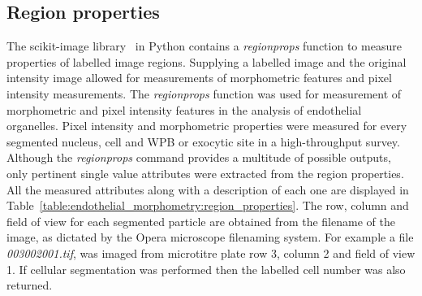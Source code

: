 \subsection{Region properties}
\label{endothelial_morphometry:morphometric_measurements}
The scikit-image library~\cite{VanderWalt2014} in Python contains a \emph{regionprops} function to measure properties of labelled image regions. Supplying a labelled image and the original intensity image allowed for measurements of morphometric features and pixel intensity measurements. The \emph{regionprops} function was used for measurement of morphometric and pixel intensity features in the analysis of endothelial organelles. Pixel intensity and morphometric properties were measured for every segmented nucleus, cell and WPB or exocytic site in a high-throughput survey. Although the \emph{regionprops} command provides a multitude of possible outputs, only pertinent single value attributes were extracted from the region properties. All the measured attributes along with a description of each one are displayed in Table~\ref{table:endothelial_morphometry:region_properties}. The row, column and field of view for each segmented particle are obtained from the filename of the image, as dictated by the Opera microscope filenaming system. For example a file \emph{003002001.tif}, was imaged from microtitre plate row 3, column 2 and field of view 1. If cellular segmentation was performed then the labelled cell number was also returned.

